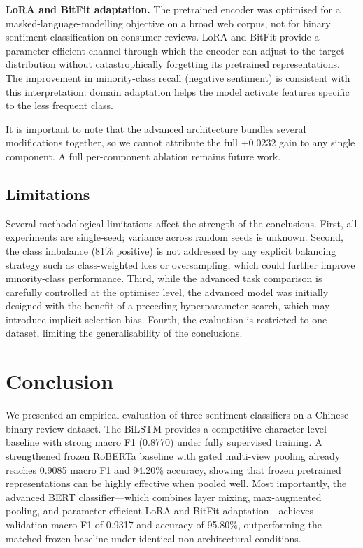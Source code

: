 \documentclass{article}
\begin{document}
\textbf{LoRA and BitFit adaptation.}  The pretrained encoder was optimised for
a masked-language-modelling objective on a broad web corpus, not for binary
sentiment classification on consumer reviews.  LoRA and BitFit provide a
parameter-efficient channel through which the encoder can adjust to the target
distribution without catastrophically forgetting its pretrained representations.
The improvement in minority-class recall (negative sentiment) is consistent with
this interpretation: domain adaptation helps the model activate features specific
to the less frequent class.

It is important to note that the advanced architecture bundles several
modifications together, so we cannot attribute the full $+0.0232$ gain to any
single component.  A full per-component ablation remains future work.

\subsection{Limitations}

Several methodological limitations affect the strength of the conclusions.
First, all experiments are single-seed; variance across random seeds is unknown.
Second, the class imbalance (81\% positive) is not addressed by any explicit
balancing strategy such as class-weighted loss or oversampling, which could
further improve minority-class performance.  Third, while the advanced task
comparison is carefully controlled at the optimiser level, the advanced model
was initially designed with the benefit of a preceding hyperparameter search,
which may introduce implicit selection bias.  Fourth, the evaluation is
restricted to one dataset, limiting the generalisability of the conclusions.

\section{Conclusion}

We presented an empirical evaluation of three sentiment classifiers on a
Chinese binary review dataset.  The BiLSTM provides a competitive character-level
baseline with strong macro F1 (0.8770) under fully supervised training.  A
strengthened frozen RoBERTa baseline with gated multi-view pooling already
reaches 0.9085 macro F1 and 94.20\% accuracy, showing that frozen pretrained
representations can be highly effective when pooled well.  Most importantly,
the advanced BERT classifier---which combines layer mixing, max-augmented
pooling, and parameter-efficient LoRA and BitFit adaptation---achieves
validation macro F1 of 0.9317 and accuracy of 95.80\%, outperforming the
matched frozen baseline under identical non-architectural conditions.
\end{document}
